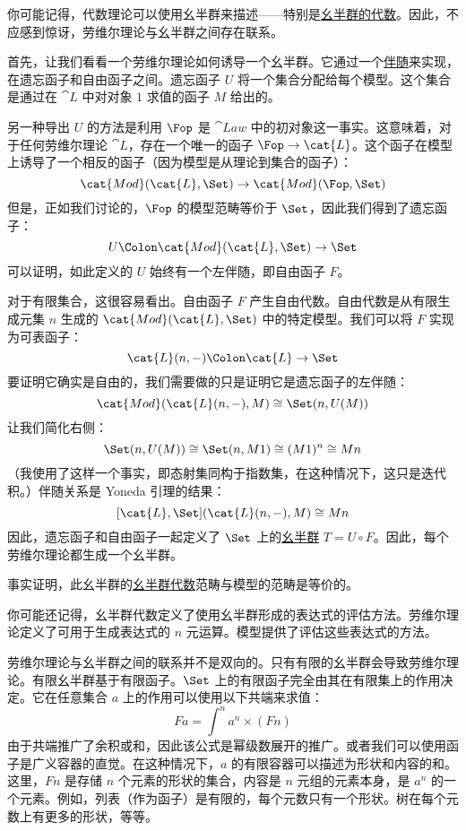 你可能记得，代数理论可以使用幺半群来描述——特别是\hyperref[algebras-for-monads]{幺半群的代数}。因此，不应感到惊讶，劳维尔理论与幺半群之间存在联系。

首先，让我们看看一个劳维尔理论如何诱导一个幺半群。它通过一个\hyperref[free-forgetful-adjunctions]{伴随}来实现，在遗忘函子和自由函子之间。遗忘函子 $U$ 将一个集合分配给每个模型。这个集合是通过在 $\cat{L}$ 中对对象 $1$ 求值的函子 $M$ 给出的。

另一种导出 $U$ 的方法是利用 $\Fop$ 是 $\cat{Law}$ 中的初对象这一事实。这意味着，对于任何劳维尔理论 $\cat{L}$，存在一个唯一的函子 $\Fop \to \cat{L}$。这个函子在模型上诱导了一个相反的函子（因为模型是从理论到集合的函子）：
\[\cat{Mod}(\cat{L}, \Set) \to \cat{Mod}(\Fop, \Set)\]
但是，正如我们讨论的，$\Fop$ 的模型范畴等价于 $\Set$，因此我们得到了遗忘函子：
\[U \Colon \cat{Mod}(\cat{L}, \Set) \to \Set\]
可以证明，如此定义的 $U$ 始终有一个左伴随，即自由函子 $F$。

对于有限集合，这很容易看出。自由函子 $F$ 产生自由代数。自由代数是从有限生成元集 $n$ 生成的 $\cat{Mod}(\cat{L}, \Set)$ 中的特定模型。我们可以将 $F$ 实现为可表函子：
\[\cat{L}(n, -) \Colon \cat{L} \to \Set\]
要证明它确实是自由的，我们需要做的只是证明它是遗忘函子的左伴随：
\[\cat{Mod}(\cat{L}(n, -), M) \cong \Set(n, U(M))\]
让我们简化右侧：
\[\Set(n, U(M)) \cong \Set(n, M 1) \cong (M 1)^n \cong M n\]
（我使用了这样一个事实，即态射集同构于指数集，在这种情况下，这只是迭代积。）伴随关系是 Yoneda 引理的结果：
\[[\cat{L}, \Set](\cat{L}(n, -), M) \cong M n\]
因此，遗忘函子和自由函子一起定义了 $\Set$ 上的\hyperref[monads-categorically]{幺半群} $T = U \circ F$。因此，每个劳维尔理论都生成一个幺半群。

事实证明，此幺半群的\hyperref[algebras-for-monads]{幺半群代数}范畴与模型的范畴是等价的。

你可能还记得，幺半群代数定义了使用幺半群形成的表达式的评估方法。劳维尔理论定义了可用于生成表达式的 $n$ 元运算。模型提供了评估这些表达式的方法。

劳维尔理论与幺半群之间的联系并不是双向的。只有有限的幺半群会导致劳维尔理论。有限幺半群基于有限函子。$\Set$ 上的有限函子完全由其在有限集上的作用决定。它在任意集合 $a$ 上的作用可以使用以下共端来求值：
\[F a = \int^n a^n \times (F n)\]
由于共端推广了余积或和，因此该公式是幂级数展开的推广。或者我们可以使用函子是广义容器的直觉。在这种情况下，$a$ 的有限容器可以描述为形状和内容的和。这里，$F n$ 是存储 $n$ 个元素的形状的集合，内容是 $n$ 元组的元素本身，是 $a^n$ 的一个元素。例如，列表（作为函子）是有限的，每个元数只有一个形状。树在每个元数上有更多的形状，等等。

